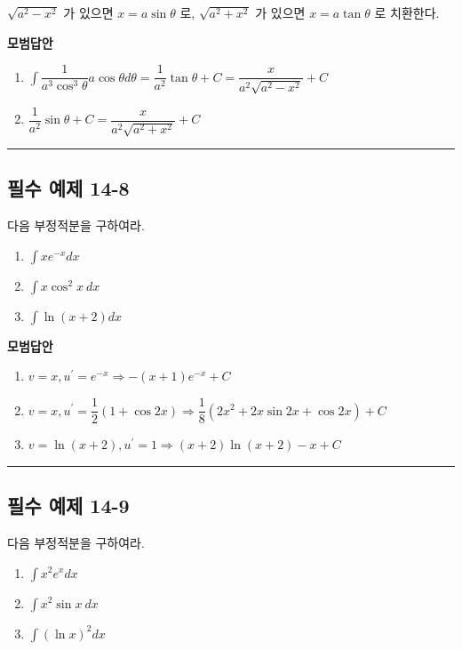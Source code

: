 \documentclass[a4paper,11pt]{article}
\begin{document}
\begin{studybox}
$\sqrt{a^{2}-x^{2}}$ 가 있으면 $x=a\sin\theta$ 로, $\sqrt{a^{2}+x^{2}}$ 가 있으면 $x=a\tan\theta$ 로 치환한다.
\end{studybox}

\textbf{모범답안}
\begin{enumerate}[label=(\arabic*)]
    \item $\int \dfrac{1}{a^3 \cos^3\theta}a \cos\theta d\theta = \dfrac{1}{a^{2}}\tan\theta+C = \dfrac{x}{a^{2}\sqrt{a^{2}-x^{2}}}+C$
    \item $\dfrac{1}{a^{2}}\sin\theta+C = \dfrac{x}{a^{2}\sqrt{a^{2}+x^{2}}}+C$
\end{enumerate}

\vspace{0.5cm}
\hrule
\vspace{0.5cm}


\subsection*{필수 예제 14-8}
다음 부정적분을 구하여라.
\begin{enumerate}[label=(\arabic*)]
    \item $\int xe^{-x}dx$
    \item $\int x\cos^{2}x~dx$
    \item $\int \ln(x+2)dx$
\end{enumerate}

\textbf{모범답안}
\begin{enumerate}[label=(\arabic*)]
    \item $ v=x, u^{\prime}=e^{-x} \Rightarrow -(x+1)e^{-x}+C$
    \item $ v=x, u^{\prime}=\dfrac{1}{2}(1+\cos 2x) \Rightarrow \dfrac{1}{8}(2x^{2}+2x\sin 2x+\cos 2x)+C$
    \item $ v=\ln(x+2), u^{\prime}=1 \Rightarrow (x+2)\ln(x+2)-x+C$
\end{enumerate}

\vspace{0.5cm}
\hrule
\vspace{0.5cm}

\subsection*{필수 예제 14-9}
다음 부정적분을 구하여라.
\begin{enumerate}[label=(\arabic*)]
    \item $\int x^{2}e^{x}dx$
    \item $\int x^{2}\sin x~dx$
    \item $\int(\ln x)^{2}dx$
\end{enumerate}
\end{document}
